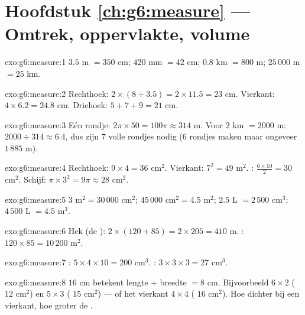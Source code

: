 \section*{Hoofdstuk \ref{ch:g6:measure} --- Omtrek, oppervlakte, volume}

\begin{solution}{exo:g6:measure:1}
$3.5$ m $= 350$ cm; \quad $420$ mm $= 42$ cm; \quad
$0.8$ km $= 800$ m; \quad $25\,000$ m $= 25$ km.
\end{solution}

\begin{solution}{exo:g6:measure:2}
Rechthoek: $2 \times (8 + 3.5) = 2 \times 11.5 = 23$ cm.
Vierkant: $4 \times 6.2 = 24.8$ cm.
Driehoek: $5 + 7 + 9 = 21$ cm.
\end{solution}

\begin{solution}{exo:g6:measure:3}
Eén rondje: $2\pi \times 50 = 100\pi \approx 314$ m. Voor $2$ km $= 2000$ m:
$2000 \div 314 \approx 6.4$, dus zijn $7$ volle rondjes nodig ($6$ rondjes maken
maar ongeveer $1\,885$ m).
\end{solution}

\begin{solution}{exo:g6:measure:4}
Rechthoek: $9 \times 4 = 36$ cm$^2$. Vierkant: $7^2 = 49$ m$^2$. : $\frac{6 \times 10}{2} = 30$ cm$^2$. Schijf:
$\pi \times 3^2 = 9\pi \approx 28$ cm$^2$.
\end{solution}

\begin{solution}{exo:g6:measure:5}
$3$ m$^2 = 30\,000$ cm$^2$; \quad
$45\,000$ cm$^2 = 4.5$ m$^2$; \quad
$2.5$ L $= 2\,500$ cm$^3$; \quad
$4\,500$ L $= 4.5$ m$^3$.
\end{solution}

\begin{solution}{exo:g6:measure:6}
Hek (de ): $2 \times (120 + 85) = 2 \times 205 = 410$ m. :
$120 \times 85 = 10\,200$ m$^2$.
\end{solution}

\begin{solution}{exo:g6:measure:7}
: $5 \times 4 \times 10 = 200$ cm$^3$. :
$3 \times 3 \times 3 = 27$ cm$^3$.
\end{solution}

\begin{solution}{exo:g6:measure:8}
 $16$ cm betekent lengte $+$ breedte $= 8$ cm. Bijvoorbeeld $6 \times 2$
( $12$ cm$^2$) en $5 \times 3$ ( $15$ cm$^2$) --- of het
vierkant $4 \times 4$ ( $16$ cm$^2$). Hoe dichter bij een vierkant,
hoe groter de .
\end{solution}

